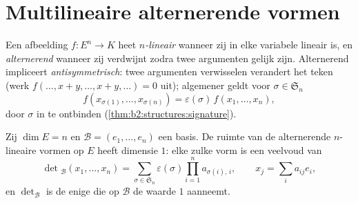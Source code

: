 \section{Multilineaire alternerende vormen}

\begin{definition}\label{def:b2:linalg:alternating}
Een afbeelding $f \colon E^n \to K$ heet \emph{$n$-lineair}
wanneer zij in elke variabele lineair is, en
\emph{alternerend} wanneer zij verdwijnt
zodra twee argumenten gelijk zijn. Alternerend impliceert
\emph{antisymmetrisch}: twee argumenten verwisselen verandert het
teken (werk $f(\dots, x + y, \dots, x + y, \dots) = 0$ uit);
algemener geldt voor $\sigma \in \mathfrak{S}_n$
\[
f(x_{\sigma(1)}, \dots, x_{\sigma(n)}) =
\varepsilon(\sigma)\, f(x_1, \dots, x_n),
\]
door $\sigma$ in  te ontbinden
(\cref{thm:b2:structures:signature}).
\end{definition}

\begin{theorem}\label{thm:b2:linalg:detspace}
Zij $\dim E = n$ en $\mathcal{B} = (e_1, \dots, e_n)$ een basis. De
ruimte van de alternerende $n$-lineaire vormen op $E$ heeft
dimensie $1$: elke zulke vorm is een veelvoud van
\[
\det{}_{\mathcal{B}}(x_1, \dots, x_n)
= \sum_{\sigma \in \mathfrak{S}_n} \varepsilon(\sigma)
\prod_{i=1}^{n} a_{\sigma(i),\,i},
\qquad
x_j = \sum_{i} a_{ij} e_i ,
\]
en $\det_{\mathcal{B}}$ is de enige die op $\mathcal{B}$ de waarde
$1$ aanneemt.
\end{theorem}

